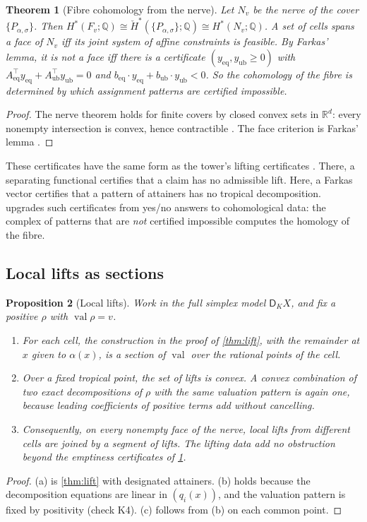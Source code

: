 \documentclass[11pt]{article}
\newtheorem{theorem}{Theorem}[section]
\newtheorem{proposition}[theorem]{Proposition}
\theoremstyle{definition}
\newcommand{\DK}{\mathsf D_{K}}
\newcommand{\R}{\mathbb R}
\newcommand{\val}{\operatorname{val}}
\begin{document}
\begin{theorem}[Fibre cohomology from the nerve]\label{thm:nerve}
Let $N_v$ be the nerve of the cover $\{P_{\alpha,\sigma}\}$. Then $H^\ast(F_v;\mathbb Q)\cong\check H^\ast(\{P_{\alpha,\sigma}\};\mathbb Q)\cong
H^\ast(N_v;\mathbb Q)$. A set of cells spans a face of $N_v$ iff its joint system of affine constraints is feasible. By Farkas' lemma,
it is \emph{not} a face iff there is a certificate $(y_{\mathrm{eq}},y_{\mathrm{ub}}\ge0)$ with
$A_{\mathrm{eq}}^\top y_{\mathrm{eq}}+A_{\mathrm{ub}}^\top y_{\mathrm{ub}}=0$ and $b_{\mathrm{eq}}\cdot y_{\mathrm{eq}}+b_{\mathrm{ub}}\cdot y_{\mathrm{ub}}<0$.
So the cohomology of the fibre is determined by which assignment patterns are certified impossible.
\end{theorem}
\begin{proof}
The nerve theorem holds for finite covers by closed convex sets in $\R^d$: every nonempty intersection is convex, hence
contractible \cite{Bjorner1995}. The face criterion is Farkas' lemma \cite{Schrijver1986}.
\end{proof}

These certificates have the same form as the tower's lifting certificates \cite[Thm.~10.8, Thm.~10.13(iii)]{Tower}. There, a
separating functional certifies that a claim has no admissible lift. Here, a Farkas vector certifies that a pattern of attainers has no
tropical decomposition.  upgrades such certificates from yes/no answers to cohomological data: the complex of
patterns that are \emph{not} certified impossible computes the homology of the fibre.

\subsection{Local lifts as sections}
\begin{proposition}[Local lifts]\label{prop:local-lifts}
Work in the full simplex model $\DK X$, and fix a positive $\rho$ with $\val\rho=v$.
\begin{enumerate}[label=(\alph*)]
\item For each cell, the construction in the proof of \cref{thm:lift}, with the remainder at $x$ given to $\alpha(x)$, is a section of
  $\val$ over the rational points of the cell.
\item Over a fixed tropical point, the set of lifts is convex. A convex combination of two exact decompositions of $\rho$ with the same
  valuation pattern is again one, because leading coefficients of positive terms add without cancelling.
\item Consequently, on every nonempty face of the nerve, local lifts from different cells are joined by a segment of lifts. The
  lifting data add no obstruction beyond the emptiness certificates of \cref{thm:nerve}.
\end{enumerate}
\end{proposition}
\begin{proof}
(a) is \cref{thm:lift} with designated attainers. (b) holds because the decomposition equations are linear in $(q_i(x))$, and the
valuation pattern is fixed by positivity (check K4). (c) follows from (b) on each common point.
\end{proof}
\end{document}
